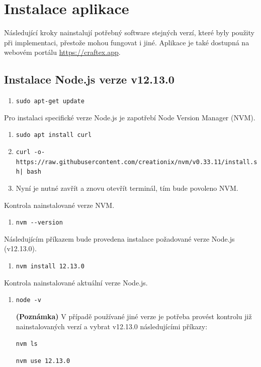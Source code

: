 \section{Instalace aplikace}
Následující kroky nainstalují potřebný software stejných verzí, které byly použity při implementaci, přestože mohou fungovat i jiné. Aplikace je také dostupná na webovém portálu \url{https://craftex.app}.

\subsection*{Instalace Node.js verze v12.13.0}
\begin{enumerate}
    \item \texttt{sudo apt-get update}
\end{enumerate}
Pro instalaci specifické verze Node.js je zapotřebí Node Version Manager (NVM).
\begin{enumerate}[resume]
    \item \texttt{sudo apt install curl}
    \item \texttt{curl -o-\newline https://raw.githubusercontent.com/creationix/nvm/v0.33.11/install.sh\newline | bash}
    \item Nyní je nutné zavřít a znovu otevřít terminál, tím bude povoleno NVM.
\end{enumerate}
Kontrola nainstalované verze NVM.
\begin{enumerate}[resume]
    \item \texttt{nvm -{}-version}
\end{enumerate}
Následujícím příkazem bude provedena instalace požadované verze Node.js (v12.13.0).
\begin{enumerate}[resume]
    \item \texttt{nvm install 12.13.0}
\end{enumerate}
Kontrola nainstalované aktuální verze Node.js.
\begin{enumerate}[resume]
    \item \texttt{node -v}

    \textbf{(Poznámka)} V případě používané jiné verze je potřeba provést kontrolu již nainstalovaných verzí a vybrat v12.13.0 následujícími příkazy:
    
    \texttt{nvm ls}
    
    \texttt{nvm use 12.13.0}
\end{enumerate}

